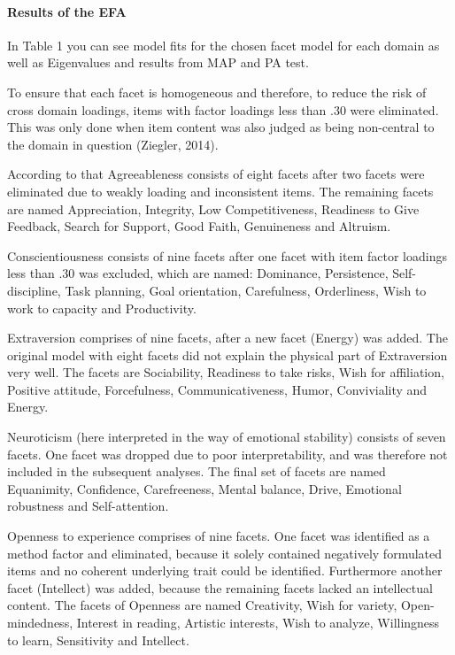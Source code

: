 \documentclass[man]{apa6}
\theoremstyle{definition}
\theoremstyle{definition}
\theoremstyle{definition}
\theoremstyle{remark}
\begin{document}
\hypertarget{results-of-the-efa}{%
\paragraph{Results of the EFA}\label{results-of-the-efa}}

In Table 1 you can see model fits for the chosen facet model for each
domain as well as Eigenvalues and results from MAP and PA test.

To ensure that each facet is homogeneous and therefore, to reduce the
risk of cross domain loadings, items with factor loadings less than .30
were eliminated. This was only done when item content was also judged as
being non-central to the domain in question (Ziegler, 2014).

According to that Agreeableness consists of eight facets after two
facets were eliminated due to weakly loading and inconsistent items. The
remaining facets are named Appreciation, Integrity, Low Competitiveness,
Readiness to Give Feedback, Search for Support, Good Faith, Genuineness
and Altruism.

Conscientiousness consists of nine facets after one facet with item
factor loadings less than .30 was excluded, which are named: Dominance,
Persistence, Self-discipline, Task planning, Goal orientation,
Carefulness, Orderliness, Wish to work to capacity and Productivity.

Extraversion comprises of nine facets, after a new facet (Energy) was
added. The original model with eight facets did not explain the physical
part of Extraversion very well. The facets are Sociability, Readiness to
take risks, Wish for affiliation, Positive attitude, Forcefulness,
Communicativeness, Humor, Conviviality and Energy.

Neuroticism (here interpreted in the way of emotional stability)
consists of seven facets. One facet was dropped due to poor
interpretability, and was therefore not included in the subsequent
analyses. The final set of facets are named Equanimity, Confidence,
Carefreeness, Mental balance, Drive, Emotional robustness and
Self-attention.

Openness to experience comprises of nine facets. One facet was
identified as a method factor and eliminated, because it solely
contained negatively formulated items and no coherent underlying trait
could be identified. Furthermore another facet (Intellect) was added,
because the remaining facets lacked an intellectual content. The facets
of Openness are named Creativity, Wish for variety, Open-mindedness,
Interest in reading, Artistic interests, Wish to analyze, Willingness to
learn, Sensitivity and Intellect.
\end{document}
